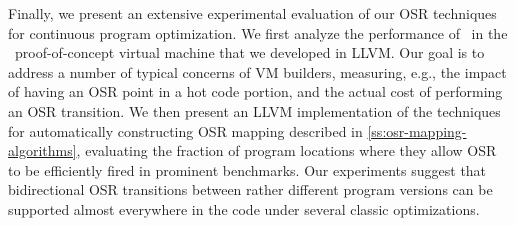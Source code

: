 Finally, we present an extensive experimental evaluation of our OSR techniques for continuous program optimization. We first analyze the performance of \osrkit\ in the \tinyvm\ proof-of-concept virtual machine that we developed in LLVM. Our goal is to address a number of typical concerns of VM builders, measuring, e.g., the impact of having an OSR point in a hot code portion, and the actual cost of performing an OSR transition. We then present an LLVM implementation of the techniques for automatically constructing OSR mapping described in \mysection\ref{ss:osr-mapping-algorithms}, evaluating the fraction of program locations where they allow OSR to be efficiently fired in prominent benchmarks. Our experiments suggest that bidirectional OSR transitions between rather different program versions can be supported almost everywhere in the code under several classic optimizations.

\ifdefined \noauthorea



\fi